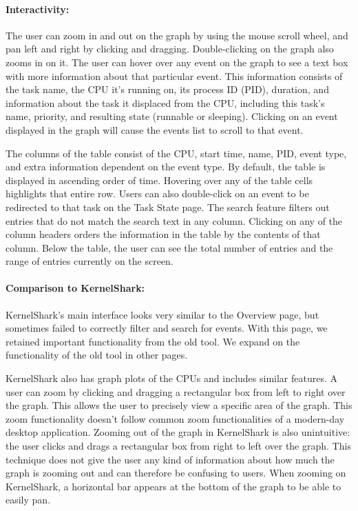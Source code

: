 \documentclass{hmcclinic}
\begin{document}
\paragraph{Interactivity:} The user can zoom in and out on the graph by using
the mouse scroll wheel, and pan left and right by clicking and dragging.
Double-clicking on the graph also zooms in on it. The user can hover over any
event on the graph to see a text box with more information about that particular
event.  This information consists of the task name, the CPU it's running on, its
process ID (PID), duration, and information about the task it displaced from the
CPU, including this task's name, priority, and resulting state (runnable or
sleeping). Clicking on an event displayed in the graph will cause the
events list to scroll to that event.

The columns of the table consist of the CPU, start time, name, PID, event type,
and extra information dependent on the event type. By default, the table is
displayed in ascending order of time.  Hovering over any of the table cells
highlights that entire row. Users can also double-click on an event to be
redirected to that task on the Task State page.  The search feature filters out
entries that do not match the search text in any column.  Clicking on any of the
column headers orders the information in the table by the contents of that
column.  Below the table, the user can see the total number of entries and the
range of entries currently on the screen.

\paragraph{Comparison to KernelShark:} 
  KernelShark's main interface looks very similar to the Overview page, but
  sometimes failed to correctly filter and search for events. With this page,
  we retained important functionality from the old tool. We expand on the
  functionality of the old tool in other pages.

  KernelShark also has graph plots of the CPUs and includes similar features. A
  user can zoom by clicking and dragging a rectangular box from left to right
  over the graph.  This allows the user to precisely view a specific area of the
  graph.  This zoom functionality doesn't follow common zoom functionalities of
  a modern-day desktop application. Zooming out of the graph in KernelShark is
  also unintuitive: the user clicks and drags a rectangular box from right to
  left over the graph. This technique does not give the user any kind of
  information about how much the graph is zooming out and can therefore be
  confusing to users. When zooming on KernelShark, a horizontal bar appears at
  the bottom of the graph to be able to easily pan.
    
\end{document}
